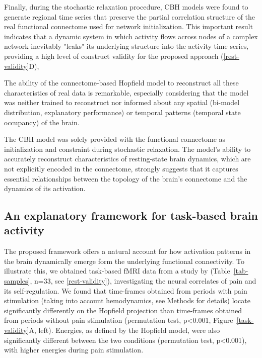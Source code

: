 \documentclass{article}
\begin{document}
Finally, during the stochastic relaxation procedure, CBH models were found to generate regional time series that preserve the partial correlation structure of the real functional connectome used for network initialization.
This important result indicates that a dynamic system in which activity flows across nodes of a complex network inevitably "leaks" its underlying structure into the activity time series, providing a high level of construct validity for the proposed approach (\ref{rest-validity}D),

The ability of the connectome-based Hopfield model to reconstruct all these characteristics of real data is remarkable, especially considering that the model was neither trained to reconstruct nor informed about any spatial (bi-model distribution, explanatory performance) or temporal patterns (temporal state occupancy) of the brain.

The CBH model was solely provided with the functional connectome as initialization and constraint during stochastic relaxation. The model's ability to accurately reconstruct characteristics of resting-state brain dynamics, which are not explicitly encoded in the connectome, strongly suggests that it captures essential relationships between the topology of the brain's connectome and the dynamics of its activation.

\subsection{An explanatory framework for task-based brain activity}\label{An explanatory framework for task-based brain activity}

The proposed framework offers a natural account for how activation patterns in the brain dynamically emerge form the underlying functional connectivity. To illustrate this, we obtained task-based fMRI data from a study by \href{https://doi.org/10.1371/journal.pbio.1002036}{} (Table~\ref{tab-samples}, n=33, see \ref{rest-validity}), investigating the neural correlates of pain and its self-regulation.
We found that time-frames obtained from periods with pain stimulation (taking into account hemodynamics, see Methods for details) locate significantly differently on the Hopfield projection than time-frames obtained from periods without pain stimulation (permutation test, p\textless 0.001, Figure~\ref{task-validity}A, left).
Energies, as defined by the Hopfield model, were also significantly different between the two conditions (permutation test, p\textless 0.001), with higher energies during pain stimulation.
\end{document}
